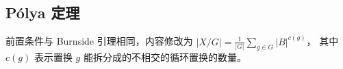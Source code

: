 \subsection{Pólya 定理}
前置条件与 Burnside 引理相同，内容修改为
$ |X/G|=\frac{1}{|G|}\sum_{g\in G}|B|^{c(g)} $，
其中 $c(g)$ 表示置换 $g$ 能拆分成的不相交的循环置换的数量。